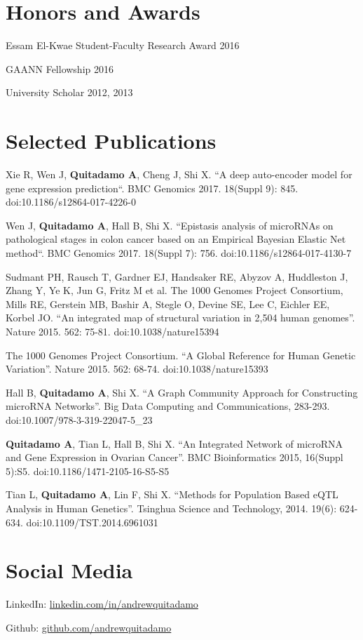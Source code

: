 \documentclass[margin,line]{res}
\begin{document}
\begin{resume}
\section{\sc Honors and Awards} 

Essam El-Kwae Student-Faculty Research Award 2016

GAANN Fellowship 2016

University Scholar 2012, 2013

\section{\sc Selected Publications}

Xie R, Wen J, {\bf Quitadamo A}, Cheng J, Shi X. ``A deep auto-encoder model for gene expression prediction``. BMC Genomics 2017. 18(Suppl 9): 845. doi:10.1186/s12864-017-4226-0

Wen J, {\bf Quitadamo A}, Hall B, Shi X. ``Epistasis analysis of microRNAs on pathological stages in colon cancer based on an Empirical Bayesian Elastic Net method``. BMC Genomics 2017. 18(Suppl 7): 756. doi:10.1186/s12864-017-4130-7

Sudmant PH, Rausch T, Gardner EJ, Handsaker RE, Abyzov A, Huddleston J, Zhang Y, Ye K, Jun G, Fritz M et al. The 1000 Genomes Project Consortium, Mills RE, Gerstein MB, Bashir A, Stegle O, Devine SE, Lee C, Eichler EE, Korbel JO. ``An integrated map of structural variation in 2,504 human genomes''. Nature 2015. 562: 75-81. doi:10.1038/nature15394

The 1000 Genomes Project Consortium. ``A Global Reference for Human Genetic Variation''. Nature 2015. 562: 68-74. doi:10.1038/nature15393

Hall B, {\bf Quitadamo A}, Shi X. ``A Graph Community Approach for Constructing microRNA Networks''. Big Data Computing and Communications, 283-293. doi:10.1007/978-3-319-22047-5\_23

{\bf Quitadamo A}, Tian L, Hall B, Shi X. ``An Integrated Network of microRNA and Gene Expression in Ovarian Cancer''. BMC Bioinformatics 2015, 16(Suppl 5):S5. doi:10.1186/1471-2105-16-S5-S5

Tian L, {\bf Quitadamo A}, Lin F, Shi X. ``Methods for Population Based eQTL Analysis in Human Genetics''. Tsinghua Science and Technology, 2014. 19(6): 624-634. doi:10.1109/TST.2014.6961031

\section{\sc Social Media}

LinkedIn: \href{http://linkedin.com/in/andrewquitadamo}{linkedin.com/in/andrewquitadamo}

Github: \href{https://github.com/andrewquitadamo}{github.com/andrewquitadamo}

\end{resume}
\end{document}
